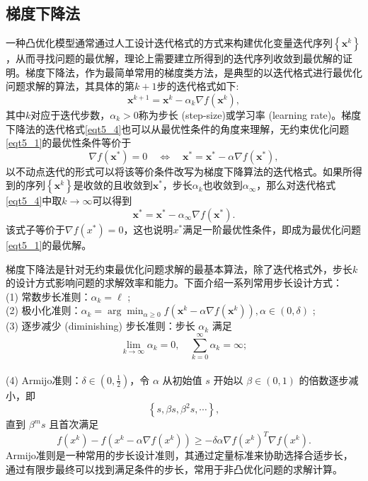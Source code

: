 \subsection{梯度下降法}
一种凸优化模型通常通过人工设计迭代格式的方式来构建优化变量迭代序列$\left\{\bm{x}^{k}\right\}$，从而寻找问题的最优解，理论上需要建立所得到的迭代序列收敛到最优解的证明\cite{6302929}。梯度下降法，作为最简单常用的梯度类方法，是典型的以迭代格式进行最优化问题求解的算法，其具体的第$k+1$步的迭代格式如下:
\begin{equation}
    \bm{x}^{k+1}=\bm{x}^{k}-\alpha_{k} \nabla f\left(\bm{x}^{k}\right),
    \label{eqt5_4}
\end{equation}
其中$k$对应于迭代步数，$\alpha_{k}>0$称为步长 (step-size)或学习率 (learning rate)。梯度下降法的迭代格式\ref{eqt5_4}也可以从最优性条件的角度来理解，无约束优化问题\ref{eqt5_1}的最优性条件等价于
\begin{equation}
    \nabla f\left(\bm{x}^{*}\right)=0 \quad \Leftrightarrow \quad \bm{x}^{*}=\bm{x}^{*}-\alpha \nabla f\left(\bm{x}^{*}\right) ,
    \nonumber
\end{equation}
以不动点迭代的形式可以将该等价条件改写为梯度下降算法的迭代格式。如果所得到的序列$\left\{\bm{x}^{k}\right\}$是收敛的且收敛到$\bm{x}^{*}$，步长$\alpha_{k}$也收敛到$\alpha_{\infty}$，那么对迭代格式\ref{eqt5_4}中取$k \rightarrow \infty$可以得到
\begin{equation}
    \bm{x}^{*}=\bm{x}^{*}-\alpha_{\infty} \nabla f\left(\bm{x}^{*}\right) .
    \nonumber
\end{equation}
该式子等价于$\nabla f\left(x^{*}\right)=0$，这也说明$x^{*}$满足一阶最优性条件，即成为最优化问题\ref{eqt5_1}的最优解。
\par 梯度下降法是针对无约束最优化问题求解的最基本算法，除了迭代格式外，步长$k$的设计方式影响问题的求解效率和能力。下面介绍一系列常用步长设计方式\cite{2009Accelerated}：
\\ (1) 常数步长准则：$\alpha_{k}=\ell$ ;
\\ (2) 极小化准则：$ \alpha_{k}=\arg \min _{\alpha \geq 0} f\left(\bm{x}^{k}-\alpha \nabla f\left(\bm{x}^{k}\right)\right), \alpha \in(0, \delta)$ ;
\\ (3) 逐步减少 (diminishing) 步长准则：步长  $\alpha_{k}$  满足
\begin{equation}
    \lim _{k \rightarrow \infty} \alpha_{k}=0, \quad \sum_{k=0}^{\infty} \alpha_{k}=\infty ;
    \nonumber
\end{equation}
\\ (4) Armijo\cite{1999Convergence}准则：$\delta \in\left(0, \frac{1}{2}\right)$，令 $\alpha$ 从初始值 $s$ 开始以 $\beta \in(0, 1)$ 的倍数逐步减小，即
\begin{equation}
    \left\{s, \beta s, \beta^{2} s, \cdots\right\} ,
    \nonumber
\end{equation}
直到 $\beta^{m} s$ 且首次满足
\begin{equation}
    f\left(x^{k}\right)-f\left(x^{k}-\alpha \nabla f\left(x^{k}\right)\right) \geq-\delta \alpha \nabla f\left(x^{k}\right)^{T} \nabla f\left(x^{k}\right) .
    \nonumber
\end{equation}
Armijo准则是一种常用的步长设计准则\cite{1999Convergence}，其通过定量标准来协助选择合适步长，通过有限步最终可以找到满足条件的步长，常用于非凸优化问题的求解计算。

